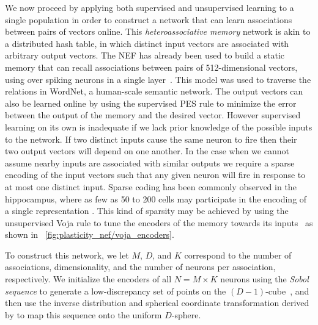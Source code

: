 We now proceed by applying both supervised and unsupervised learning to a single population in order to construct a network that can learn associations between pairs of vectors online.
This {\it heteroassociative memory} network is akin to a distributed hash table, in which distinct input vectors are associated with arbitrary output vectors.
The NEF has already been used to build a static memory that can recall  associations between pairs of 512-dimensional vectors, using over  spiking neurons in a single layer~\citep{crawford2015}.
This model was used to traverse the relations in WordNet, a human-scale semantic network.
The output vectors can also be learned online by using the supervised PES rule to minimize the error between the output of the memory and the desired vector.
However supervised learning on its own is inadequate if we lack prior knowledge of the possible inputs to the network. If two distinct inputs cause the same neuron to fire then their two output vectors will depend on one another.
In the case when we cannot assume nearby inputs are associated with similar outputs we require a sparse encoding of the input vectors such that any given neuron will fire in response to at most one distinct input.
Sparse coding has been commonly observed in the hippocampus, where as few as 50 to 200 cells may participate in the encoding of a single representation \citep{Quiroga2012, Mainetti2015}.
This kind of sparsity may be achieved by using the unsupervised Voja rule to tune the encoders of the memory towards its inputs~\citep{voelker2014a} as shown in \figurename~\ref{fig:plasticity_nef/voja_encoders}.

To construct this network, we let $M$, $D$, and $K$ correspond to the number of associations, dimensionality, and the number of neurons per association, respectively.
We initialize the encoders of all $N = M \times K$ neurons using the {\it Sobol sequence} to generate a low-discrepancy set of points on the $(D-1)$-cube~\citep{Sobol1967}, and then use the inverse distribution and spherical coordinate transformation derived by \citet{Fang1994} to map this sequence onto the uniform $D$-sphere.

